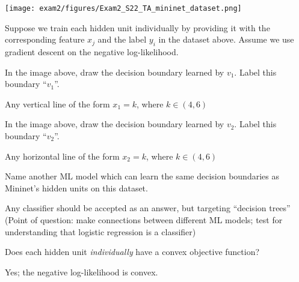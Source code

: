 \begin{parts}
\begin{subparts}
{    \texttt{[image: exam2/figures/Exam2\_S22\_TA\_mininet\_dataset.png]}
    
    Suppose we train each hidden unit individually by providing it with the corresponding feature $x_j$ and the label $y_i$ in the dataset above. Assume we use gradient descent on the negative log-likelihood.
    }

        \subpart[1]
            In the image above, draw the decision boundary learned by $v_1$. Label this boundary ``$v_1$''.

            \begin{soln}
                Any vertical line of the form $x_1=k$, where $k\in (4, 6)$
            \end{soln}


        \subpart[1]
            In the image above, draw the decision boundary learned by $v_2$. Label this boundary ``$v_2$''.

            \begin{soln}
                Any horizontal line of the form $x_2=k$, where $k\in (4, 6)$
            \end{soln} 
    
    
        \subpart[1]
            Name another ML model which can learn the same decision boundaries as Mininet's hidden units on this dataset.
            
            \begin{tcolorbox}[fit,height=3cm, width=15cm, blank, borderline={1pt}{-2pt}]
            \end{tcolorbox}
            \begin{soln}
                Any classifier should be accepted as an answer, but targeting ``decision trees'' (Point of question: make connections between different ML models; test for understanding that logistic regression is a classifier)
            \end{soln}
            
        
        \subpart[2]
            Does each hidden unit \textit{individually} have a convex objective function?
            
            \begin{tcolorbox}[fit,height=3cm, width=15cm, blank, borderline={1pt}{-2pt}]
            \end{tcolorbox}
            \begin{soln}
                Yes; the negative log-likelihood is convex.
            \end{soln}
    


\end{subparts}
\end{parts}
